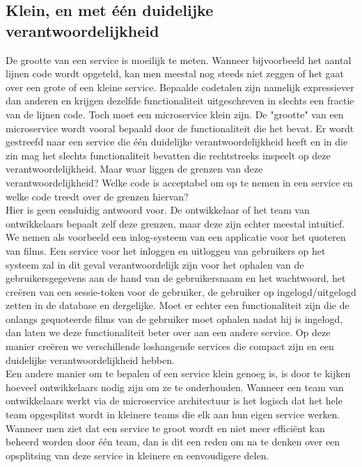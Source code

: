 \documentclass[pdftex,a4paper,12pt,twoside]{report}
\begin{document}
\subsection{Klein, en met één duidelijke verantwoordelijkheid}
\label{subsec:klein}
De grootte van een service is moeilijk te meten. Wanneer bijvoorbeeld het aantal lijnen code wordt opgeteld, kan men meestal nog steeds niet zeggen of het gaat over een grote of een kleine service. Bepaalde codetalen zijn namelijk expressiever dan anderen en krijgen dezelfde functionaliteit uitgeschreven in slechts een fractie van de lijnen code. Toch moet een microservice klein zijn. De "grootte" van een microservice wordt vooral bepaald door de functionaliteit die het bevat. Er wordt gestreefd naar een service die één duidelijke verantwoordelijkheid heeft en in die zin mag het slechts functionaliteit bevatten die rechtstreeks inspeelt op deze verantwoordelijkheid. Maar waar liggen de grenzen van deze verantwoordelijkheid? Welke code is acceptabel om op te nemen in een service en welke code treedt over de grenzen hiervan?
\\
Hier is geen eenduidig antwoord voor. De ontwikkelaar of het team van ontwikkelaars bepaalt zelf deze grenzen, maar deze zijn echter meestal intuïtief. We nemen als voorbeeld een inlog-systeem van een applicatie voor het quoteren van films. Een service voor het inloggen en uitloggen van gebruikers op het systeem zal in dit geval verantwoordelijk zijn voor het ophalen van de gebruikersgegevens aan de hand van de gebruikersnaam en het wachtwoord, het creëren van een sessie-token voor de gebruiker, de gebruiker op ingelogd/uitgelogd zetten in de database en dergelijke. Moet er echter een functionaliteit zijn die de onlangs gequoteerde films van de gebruiker moet ophalen nadat hij is ingelogd, dan laten we deze functionaliteit beter over aan een andere service. Op deze manier creëren we verschillende loshangende services die compact zijn en een duidelijke verantwoordelijkheid hebben.
\\
Een andere manier om te bepalen of een service klein genoeg is, is door te kijken hoeveel ontwikkelaars nodig zijn om ze te onderhouden. Wanneer een team van ontwikkelaars werkt via de microservice architectuur is het logisch dat het hele team opgesplitst wordt in kleinere teams die elk aan hun eigen service werken. Wanneer men ziet dat een service te groot wordt en niet meer efficiënt kan beheerd worden door één team, dan is dit een reden om na te denken over een opsplitsing van deze service in kleinere en eenvoudigere delen.
\\
\\
\end{document}

